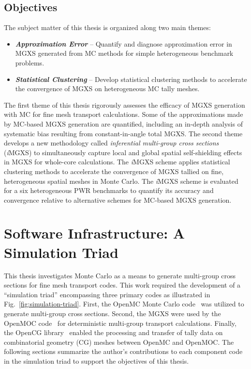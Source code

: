 \documentclass[12pt,twoside]{mitthesis-exec}
\begin{document}
\subsection*{Objectives}

The subject matter of this thesis is organized along two main themes:

\begin{itemize}
\item \textbf{\textit{Approximation Error}} -- Quantify and diagnose approximation error in MGXS generated from MC methods for simple heterogeneous benchmark problems.
\item \textbf{\textit{Statistical Clustering}} -- Develop statistical clustering methods to accelerate the convergence of MGXS on heterogeneous MC tally meshes.
\end{itemize}

The first theme of this thesis rigorously assesses the efficacy of MGXS generation with MC for fine mesh transport calculations. Some of the approximations made by MC-based MGXS generation are quantified, including an in-depth analysis of systematic bias resulting from constant-in-angle total MGXS. The second theme develops a new methodology called \textit{inferential multi-group cross sections} (\textit{i}MGXS) to simultaneously capture local and global spatial self-shielding effects in MGXS for whole-core calculations. The \textit{i}MGXS scheme applies statistical clustering methods to accelerate the convergence of MGXS tallied on fine, heterogeneous spatial meshes in Monte Carlo. The \textit{i}MGXS scheme is evaluated for a six heterogeneous PWR benchmarks to quantify its accuracy and convergence relative to alternative schemes for MC-based MGXS generation.

\section*{Software Infrastructure: A Simulation Triad}

This thesis investigates Monte Carlo as a means to generate multi-group cross sections for fine mesh transport codes. This work required the development of a ``simulation triad'' encompassing three primary codes as illustrated in Fig.~\ref{fig:simulation-triad}. First, the OpenMC Monte Carlo code~\cite{romano2013openmc} was utilized to generate multi-group cross sections. Second, the MGXS were used by the OpenMOC code~\cite{boyd2014openmoc} for deterministic multi-group transport calculations. Finally, the OpenCG library~\cite{boyd2015opencg} enabled the processing and transfer of tally data on combinatorial geometry (CG) meshes between OpenMC and OpenMOC. The following sections summarize the author's contributions to each component code in the simulation triad to support the objectives of this thesis.
\end{document}
